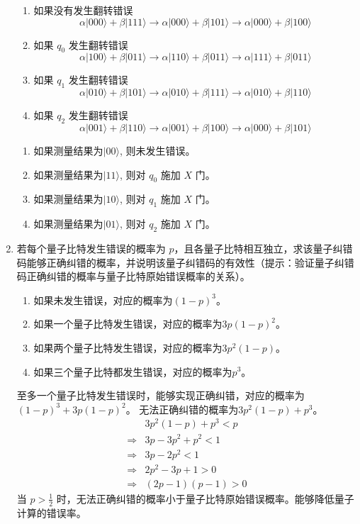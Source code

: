 \documentclass[11pt]{article}
\begin{document}
\begin{enumerate}[label=\alph*.]
    \begin{enumerate}
        \item 如果没有发生翻转错误
        \[
        \alpha |000\rangle + \beta |111\rangle \rightarrow \alpha |000\rangle + \beta |101\rangle \rightarrow \alpha |000\rangle + \beta |100\rangle
        \]
        \item 如果 $q_0$ 发生翻转错误
        \[
        \alpha |100\rangle + \beta |011\rangle \rightarrow \alpha |110\rangle + \beta |011\rangle \rightarrow \alpha |111\rangle + \beta |011\rangle
        \]
        \item 如果 $q_1$ 发生翻转错误
        \[
        \alpha |010\rangle + \beta |101\rangle \rightarrow \alpha |010\rangle + \beta |111\rangle \rightarrow \alpha |010\rangle + \beta |110\rangle
        \]
        \item 如果 $q_2$ 发生翻转错误
        \[
        \alpha |001\rangle + \beta |110\rangle \rightarrow \alpha |001\rangle + \beta |100\rangle \rightarrow \alpha |000\rangle + \beta |101\rangle
        \]
    \end{enumerate}
    \begin{enumerate}
        \item 如果测量结果为$|00\rangle$, 则未发生错误。
        \item 如果测量结果为$|11\rangle$, 则对 $q_0$ 施加 $X$ 门。
        \item 如果测量结果为$|10\rangle$, 则对 $q_1$ 施加 $X$ 门。
        \item 如果测量结果为$|01\rangle$, 则对 $q_2$ 施加 $X$ 门。
    \end{enumerate}
	\item 若每个量子比特发生错误的概率为 $p$，且各量子比特相互独立，求该量子纠错码能够正确纠错的概率，并说明该量子纠错码的有效性（提示：验证量子纠错码正确纠错的概率与量子比特原始错误概率的关系）。
	\begin{enumerate}
        \item 如果未发生错误，对应的概率为$(1-p)^3$。
        \item 如果一个量子比特发生错误，对应的概率为$3p(1-p)^2$。
        \item 如果两个量子比特发生错误，对应的概率为$3p^2(1-p)$。
        \item 如果三个量子比特都发生错误，对应的概率为$p^3$。
    \end{enumerate}
    
    至多一个量子比特发生错误时，能够实现正确纠错，对应的概率为$(1-p)^3 + 3p(1-p)^2$。
    无法正确纠错的概率为$3p^2(1-p) + p^3$。
    \[
    \begin{aligned}
        &3p^2(1-p) + p^3 < p \\
        \Rightarrow &3p - 3p^2 + p^2 < 1 \\
        \Rightarrow &3p - 2p^2 < 1 \\
        \Rightarrow &2p^2 - 3p + 1 > 0 \\
        \Rightarrow &(2p-1)(p-1) > 0
    \end{aligned}
    \]
    当 $p > \frac{1}{2}$ 时，无法正确纠错的概率小于量子比特原始错误概率。能够降低量子计算的错误率。
\end{enumerate}
\end{document}
